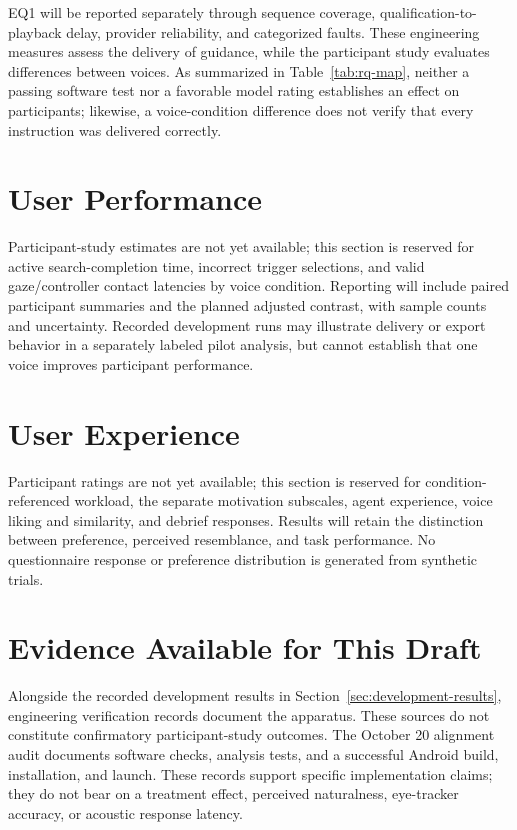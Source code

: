 EQ1 will be reported separately through sequence coverage, qualification-to-playback delay, provider reliability, and categorized faults. These engineering measures assess the delivery of guidance, while the participant study evaluates differences between voices. As summarized in Table~\ref{tab:rq-map}, neither a passing software test nor a favorable model rating establishes an effect on participants; likewise, a voice-condition difference does not verify that every instruction was delivered correctly.

\section{User Performance}
Participant-study estimates are not yet available; this section is reserved for active search-completion time, incorrect trigger selections, and valid gaze/controller contact latencies by voice condition. Reporting will include paired participant summaries and the planned adjusted contrast, with sample counts and uncertainty. Recorded development runs may illustrate delivery or export behavior in a separately labeled pilot analysis, but cannot establish that one voice improves participant performance.

\section{User Experience}
Participant ratings are not yet available; this section is reserved for condition-referenced workload, the separate motivation subscales, agent experience, voice liking and similarity, and debrief responses. Results will retain the distinction between preference, perceived resemblance, and task performance. No questionnaire response or preference distribution is generated from synthetic trials.

\section{Evidence Available for This Draft}
Alongside the recorded development results in Section~\ref{sec:development-results}, engineering verification records document the apparatus. These sources do not constitute confirmatory participant-study outcomes. The October 20 alignment audit documents software checks, analysis tests, and a successful Android build, installation, and launch. These records support specific implementation claims; they do not bear on a treatment effect, perceived naturalness, eye-tracker accuracy, or acoustic response latency.

